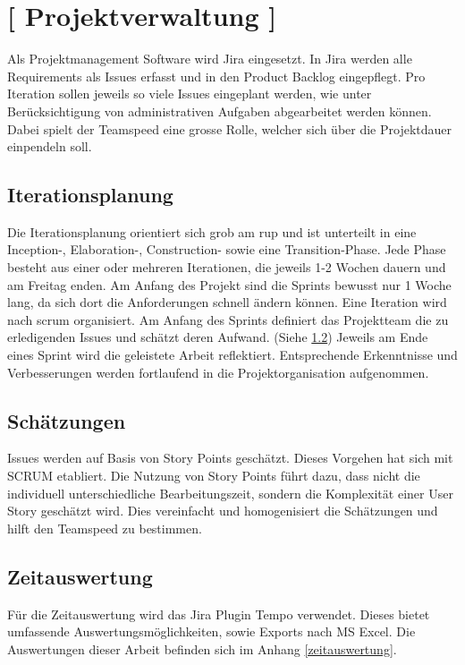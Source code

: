 \documentclass[11pt,a4paper,english,oneside]{book}
\numberwithin{equation}{chapter}
\begin{document}
	\section{ [ Projektverwaltung ] }
	
	Als Projektmanagement Software wird Jira \cite{jira} eingesetzt. In Jira werden alle Requirements als Issues erfasst und in den Product Backlog eingepflegt. Pro Iteration sollen jeweils so viele Issues eingeplant werden, wie unter Berücksichtigung von administrativen Aufgaben abgearbeitet werden können. Dabei spielt der Teamspeed eine grosse Rolle, welcher sich über die Projektdauer einpendeln soll. 

	
	
	\subsection{Iterationsplanung}
	
	Die Iterationsplanung orientiert sich grob am \gls{rup} und ist unterteilt in eine Inception-, Elaboration-, Construction- sowie eine Transition-Phase. Jede Phase besteht aus einer oder mehreren Iterationen, die jeweils 1-2 Wochen dauern und am Freitag enden. Am Anfang des Projekt sind die Sprints bewusst nur 1 Woche lang, da sich dort die Anforderungen schnell ändern können. Eine Iteration wird nach \gls{scrum} organisiert. Am Anfang des Sprints definiert das Projektteam die zu erledigenden Issues und schätzt deren Aufwand. (Siehe \ref{sec:estimations}) Jeweils am Ende eines Sprint wird die geleistete Arbeit reflektiert. Entsprechende Erkenntnisse und Verbesserungen werden fortlaufend in die Projektorganisation aufgenommen. 
		
	\subsection{Schätzungen}
	\label{sec:estimations}
	Issues werden auf Basis von Story Points geschätzt. Dieses Vorgehen hat sich mit SCRUM etabliert. Die Nutzung von Story Points führt dazu, dass nicht die individuell unterschiedliche Bearbeitungszeit, sondern die Komplexität einer User Story geschätzt wird. Dies vereinfacht  und homogenisiert die Schätzungen und hilft den Teamspeed zu bestimmen.\cite{storypoints, storypoints2}
	
	\subsection{Zeitauswertung}
	Für die Zeitauswertung wird das Jira Plugin Tempo \cite{jiratempo} verwendet. Dieses bietet umfassende Auswertungsmöglichkeiten, sowie Exports nach MS Excel. Die Auswertungen dieser Arbeit befinden sich im Anhang \ref{zeitauswertung}.
	
\end{document}
